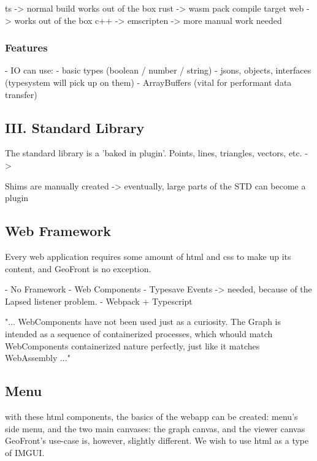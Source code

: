 ts -> normal build works out of the box
rust -> wasm pack compile target web -> works out of the box 
c++ -> emscripten -> more manual work needed 

\subsubsection{Features}
- IO can use:
  - basic types (boolean / number / string)
  - jsons, objects, interfaces (typesystem will pick up on them)
  - ArrayBuffers (vital for performant data transfer)




  \subsection{ III. Standard Library }

  The standard library is a 'baked in plugin'.
  Points, lines, triangles, vectors, etc.
  -> 

  Shims are manually created
  -> eventually, large parts of the STD can become a plugin
  



\subsection{Web Framework}
Every web application requires some amount of html and css to make up its content, and GeoFront is no exception. 


- No Framework
- Web Components
- Typesave Events -> needed, because of the Lapsed listener problem.
- Webpack + Typescript

"...
WebComponents have not been used just as a curiosity. 
The Graph is intended as a sequence of containerized processes, 
which whould match WebComponents containerized nature perfectly, just like it matches WebAssembly
..."



\subsection{Menu}
with these html components, the basics of the webapp can be created: menu's side menu, and the two main canvases: the graph canvas, and the viewer canvas 
GeoFront's use-case is, however, slightly different. We wish to use html as a type of IMGUI. 




